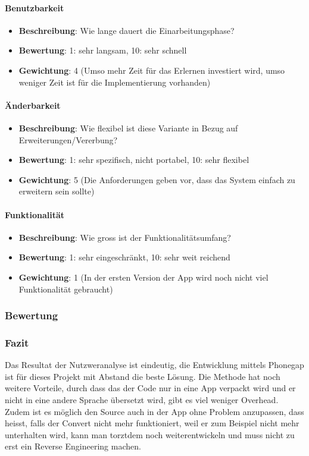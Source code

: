 \paragraph{Benutzbarkeit}
\begin{itemize}
	\item \textbf{Beschreibung}: Wie lange dauert die Einarbeitungsphase? 
	\item \textbf{Bewertung}: 1: sehr langsam, 10: sehr schnell
	\item \textbf{Gewichtung}: 4 (Umso mehr Zeit für das Erlernen investiert wird, umso weniger Zeit ist für die Implementierung vorhanden)
\end{itemize}

\paragraph{Änderbarkeit}
\begin{itemize}
	\item \textbf{Beschreibung}: Wie flexibel ist diese Variante in Bezug auf Erweiterungen/Vererbung?
	\item \textbf{Bewertung}: 1: sehr spezifisch, nicht portabel, 10: sehr flexibel
	\item \textbf{Gewichtung}: 5 (Die Anforderungen geben vor, dass das System einfach zu erweitern sein sollte)
\end{itemize}

\paragraph{Funktionalität}
\begin{itemize}
	\item \textbf{Beschreibung}: Wie gross ist der Funktionalitätsumfang?
	\item \textbf{Bewertung}: 1: sehr eingeschränkt, 10: sehr weit reichend
	\item \textbf{Gewichtung}: 1 (In der ersten Version der App wird noch nicht viel Funktionalität gebraucht)
\end{itemize}

\newpage
\subsubsection{Bewertung}\label{architektur_bewertung}


\FloatBarrier
\subsubsection{Fazit}\label{architektur_fazit}
Das Resultat der Nutzweranalyse ist eindeutig, die Entwicklung mittels Phonegap ist für dieses Projekt mit Abstand die beste Lösung. Die Methode hat noch weitere Vorteile, durch dass das der Code nur in eine App verpackt wird und er nicht in eine andere Sprache übersetzt wird, gibt es viel weniger Overhead. Zudem ist es möglich den Source auch in der App ohne Problem anzupassen, dass heisst, falls der Convert nicht mehr funktioniert, weil er zum Beispiel nicht mehr unterhalten wird, kann man torztdem noch weiterentwickeln und muss nicht zu erst ein Reverse Engineering machen.

